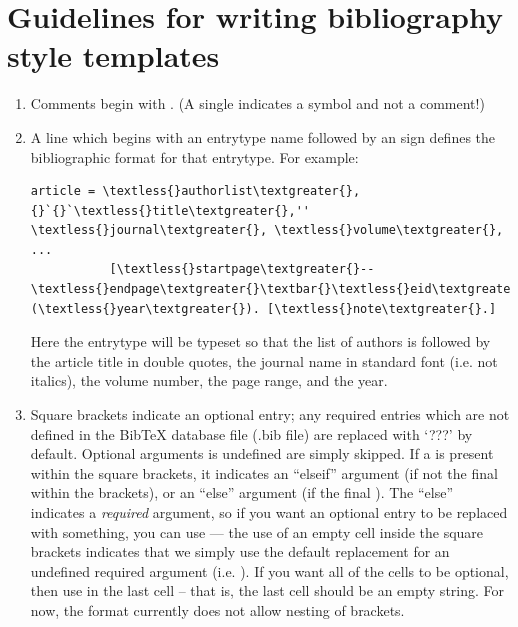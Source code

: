 \documentclass[letterpaper,10pt,english]{sphinxmanual}
\begin{document}
\chapter{Guidelines for writing bibliography style templates}
\label{guidelines_for_writing_style_templates:guidelines-for-writing-bibliography-style-templates}\label{guidelines_for_writing_style_templates::doc}\begin{enumerate}
\item {} 
Comments begin with \code{\#}. (A single \code{\#} indicates a symbol and not a comment!)

\item {} 
A line which begins with an entrytype name followed by an \code{=} sign defines the bibliographic format for that entrytype. For example:

\begin{Verbatim}[commandchars=\\\{\}]
article = \textless{}authorlist\textgreater{}, {}`{}`\textless{}title\textgreater{},'' \textless{}journal\textgreater{}, \textless{}volume\textgreater{}, ...
           [\textless{}startpage\textgreater{}--\textless{}endpage\textgreater{}\textbar{}\textless{}eid\textgreater{}\textbar{}]  (\textless{}year\textgreater{}). [\textless{}note\textgreater{}.]
\end{Verbatim}

Here the  entrytype will be typeset so that the list of authors is followed by the article title in double quotes, the journal name in standard font (i.e. not italics), the volume number, the page range, and the year.

\item {} 
Square brackets \code{{[}{]}} indicate an optional entry; any required entries which are not defined in the BibTeX database file (.bib file) are replaced with `???' by default. Optional arguments is undefined are simply skipped. If a \code{\textbar{}} is present within the square brackets, it indicates an ``elseif'' argument (if not the final \code{\textbar{}} within the brackets), or an ``else'' argument (if the final \code{\textbar{}}). The ``else'' indicates a \emph{required} argument, so if you want an optional entry to be replaced with something, you can use  --- the use of an empty cell inside the square brackets indicates that we simply use the default replacement for an undefined required argument (i.e. ). If you want all of the cells to be optional, then use \code{\textbar{}''{]}} in the last cell -- that is, the last cell should be an empty string. For  now, the format currently does not allow nesting of brackets.


\end{enumerate}
\end{document}

